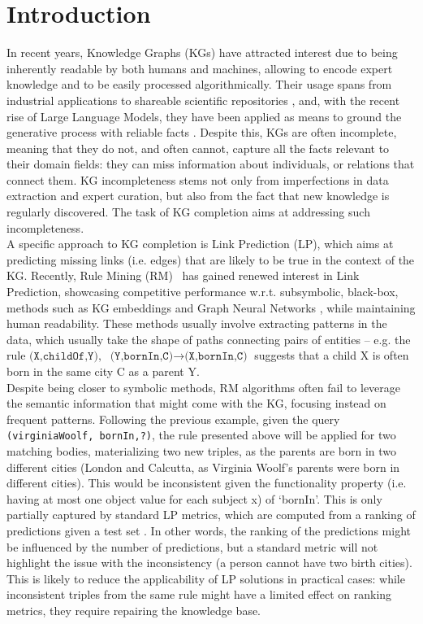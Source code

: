 \documentclass[a4paper,UKenglish,cleveref, autoref, thm-restate]{tgdk-v2021}
\begin{document}
\section{Introduction}
In recent years, Knowledge Graphs (KGs) \cite{hogan_knowledge_2022} have attracted interest due to  being inherently readable by both humans and machines, allowing  to encode expert knowledge and to be easily processed algorithmically. Their usage spans from industrial applications \cite{deng_research_2022,han_construction_2022,tang_exploring_2023} to shareable scientific repositories \cite{dessi_cs-kg_2025,himmelstein_systematic_2017,jaradeh_open_2019}, and, with the recent rise of Large Language Models, they have been applied as means to ground the generative process with reliable facts \cite{procko_graph_2024}. Despite this, KGs are often incomplete, meaning that they do not, and often cannot, capture all the facts relevant to their domain fields: they can miss information about individuals, or relations that connect them. KG incompleteness stems not only from imperfections in data extraction and expert curation, but also from the fact that new knowledge is  regularly discovered. The task of KG completion aims at addressing such incompleteness. \\
\indent A specific approach to KG completion is Link Prediction (LP), which aims at predicting missing links (i.e. edges) that are likely to be true in the context of the KG. Recently, Rule Mining (RM)~\cite{harth_fast_2020,meilicke_anytime_2024} has gained renewed interest in Link Prediction, showcasing competitive performance w.r.t. subsymbolic, black-box, methods such as KG embeddings \cite{wang_knowledge_2017} and Graph Neural Networks \cite{ye_comprehensive_2022}, while maintaining human readability. These methods usually involve extracting patterns in the data, which usually take the shape of paths connecting pairs of entities -- e.g. the rule  $\texttt{(X,childOf,Y)},$ $ \texttt{(Y,bornIn,C)} \rightarrow \texttt{(X,bornIn,C)}$ suggests that a child X is often born in the same city C as a parent Y. \\
\indent  Despite being closer to symbolic methods, RM algorithms often fail to leverage the semantic information that might come with the KG, focusing instead on frequent patterns. 
Following the previous example, given the query \texttt{(virginiaWoolf, bornIn,?)}, the rule presented above will be applied for two matching bodies, materializing two new triples, as the parents are born in two different cities (London and Calcutta, as Virginia Woolf's parents were born in different cities). This would be inconsistent given the functionality property (i.e. having at most one object value for each subject x) of `bornIn'. This is only partially captured by standard LP metrics, which are computed from a ranking of predictions given a test set \cite{paulheim_knowledge_2016}. In other words, the ranking of the predictions might be influenced by the number of predictions, but a standard metric will not highlight the issue with the inconsistency (a person cannot have two birth cities). This is likely to reduce the applicability of LP solutions in practical cases: while inconsistent triples from the same rule might have a limited effect on ranking metrics, they require repairing the knowledge base.\\
\end{document}
